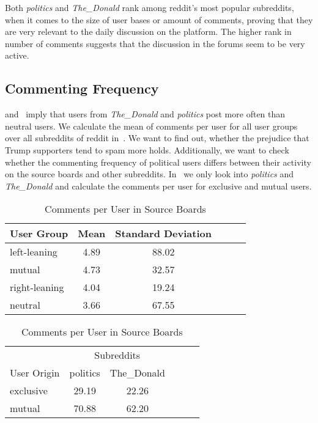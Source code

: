 \documentclass[runningheads,a4paper]{llncs}
\newcommand{\boards}[1]{\textit{politics} #1 \textit{The\_Donald}}
\begin{document}
	Both \boards{and} rank among reddit's most popular subreddits, when it comes to the size of user bases or amount of comments, proving that they are very relevant to the daily discussion on the platform. The higher rank in number of comments suggests that the discussion in the forums seem to be very active.
	
	
	\subsection{Commenting Frequency}\label{sub:cross_subreddit_commenting_frequency}
	 and~ imply that users from \textit{The\_Donald} and \textit{politics} post more often than neutral users. We calculate the mean of comments per user for all user groups over all subreddits of reddit in~. We want to find out, whether the prejudice that Trump supporters tend to spam more holds.
	Additionally, we want to check whether the commenting frequency of political users differs between their activity on the source boards and other subreddits. In~ we only look into \boards{and} and calculate the comments per user for exclusive and mutual users.
	
	\begin{table}%
		\begin{subtable}[t]{0.45\textwidth}%
			\centering
			\caption{Comments per User}
			\setlength{\tabcolsep}{5px}
			\begin{tabular}{lccccc}
				\hline\hline
				User Group & Mean & Standard Deviation \\
				\hline
				left-leaning & 4.89 & 88.02 \\
				mutual & 4.73 & 32.57 \\
				right-leaning & 4.04 & 19.24 \\
				neutral & 3.66 & 67.55 \\
				\hline\hline
			\end{tabular}
			\label{table:comments_per_user}
		\end{subtable}%
		\hspace{1cm}
		\begin{subtable}[t]{0.45\textwidth}%
			\caption{Comments per User in Source Boards}
			\centering
			\setlength{\tabcolsep}{5px}
			\begin{tabular}{lccccc}
				\hline\hline
				& \multicolumn{2}{c}{Subreddits} \\
				User Origin  & politics & The\_Donald \\
				\hline
				exclusive     & 29.19    & 22.26 \\
				mutual       & 70.88     & 62.20 \\
				\hline\hline
			\end{tabular}
			\label{table:comments_per_user_source}
		\end{subtable}%
	\end{table}%
	
\end{document}
